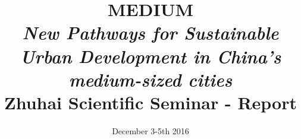 




\title{MEDIUM\\\medskip
\textit{New Pathways for Sustainable Urban Development in China’s medium-sized cities}\\\medskip
Zhuhai Scientific Seminar - Report}
\author{}
\date{December 3-5th 2016}


\maketitle

\justify


\begin{abstract}
\end{abstract}





\newpage







